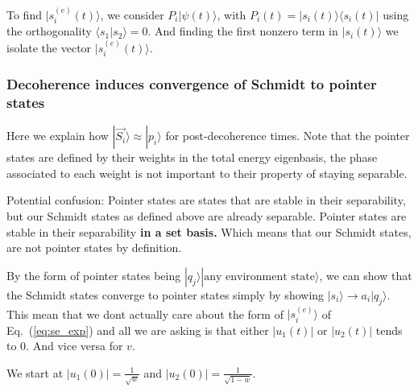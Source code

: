 \documentclass{article}
\begin{document}
To find $|s^{(e)}_i(t)\rangle$, we consider $P_i|\psi(t)\rangle$, with $P_i(t)=|s_i(t)\rangle\langle s_i(t)|$ using the orthogonality $\langle s_1|s_2 \rangle=0$. And finding the first nonzero term in $|s_i(t)\rangle$ we isolate the vector $|s^{(e)}_i(t)\rangle$. \\ 


\subsubsection{Decoherence induces convergence of Schmidt to pointer states}

Here we explain how $|\vec{S_i}\rangle\approx|p_i\rangle$ for post-decoherence times. Note that the pointer states are defined by their weights in the total energy eigenbasis, the phase associated to each weight is not important to their property of staying separable.

Potential confusion: Pointer states are states that are stable in their separability, but our Schmidt states as defined above are already separable. Pointer states are stable in their separability \textbf{in a set basis.} Which means that our Schmidt states, are not pointer states by definition.

By the form of pointer states being $|q_j\rangle|\text{any environment state}\rangle$, we can show that the Schmidt states converge to pointer states simply by showing $|s_i\rangle\rightarrow a_i|q_j\rangle$. This mean that we dont actually care about the form of $|s^{(e)}_i\rangle$ of Eq.~(\ref{eq:se_exp}) and all we are asking is that either $|u_1(t)|$ or $|u_2(t)|$ tends to 0. And vice versa for $v$.

We start at $|u_1(0)|=\frac{1}{\sqrt{w}}$ and $|u_2(0)|=\frac{1}{\sqrt{1-w}}$. 
\end{document}
